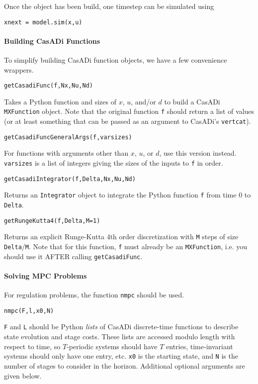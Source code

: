 \documentclass{article}
\newcommand{\funcname}[1]{\vspace{.25em}\noindent\texttt{#1}\vspace{.25em}}
\newcommand{\casadi}{CasADi}
\begin{document}
\begin{multicols}{2}
Once the object has been build, one timestep can be simulated using
\begin{lstlisting}[frame=L]
xnext = model.sim(x,u)
\end{lstlisting}

\paragraph*{Building \casadi{} Functions}

To simplify building \casadi{} function objects, we have a few convenience wrappers.

\funcname{getCasadiFunc(f,Nx,Nu,Nd)}

Takes a Python function and sizes of $x$, $u$, and/or $d$ to build a \casadi{} \texttt{MXFunction} object.
Note that the original function \texttt{f} should return a list of values (or at least something that can be passed as an argument to \casadi's \texttt{vertcat}).

\funcname{getCasadiFuncGeneralArgs(f,varsizes)}

For functions with arguments other than $x$, $u$, or $d$, use this version instead. \texttt{varsizes} is a list of integers giving the sizes of the inputs to \texttt{f} in order.

\funcname{getCasadiIntegrator(f,Delta,Nx,Nu,Nd)}

Returns an \texttt{Integrator} object to integrate the Python function \texttt{f} from time 0 to \texttt{Delta}.

\funcname{getRungeKutta4(f,Delta,M=1)}

Returns an explicit Runge-Kutta 4th order discretization with \texttt{M} steps of size \texttt{Delta}/\texttt{M}.
Note that for this function, \texttt{f} must already be an \texttt{MXFunction}, i.e. you should use it AFTER calling \texttt{getCasadiFunc}.

\paragraph*{Solving MPC Problems}

For regulation problems, the function \texttt{nmpc} should be used.

\funcname{nmpc(F,l,x0,N)}

\texttt{F} and \texttt{L} should be Python \emph{lists} of \casadi{} discrete-time functions to describe state evolution and stage costs.
These lists are accessed modulo length with respect to time, so $T$-periodic systems should have $T$ entries, time-invariant systems should only have one entry, etc.
\texttt{x0} is the starting state, and \texttt{N} is the number of stages to consider in the horizon. Additional optional arguments are given below.


\end{multicols}
\end{document}
